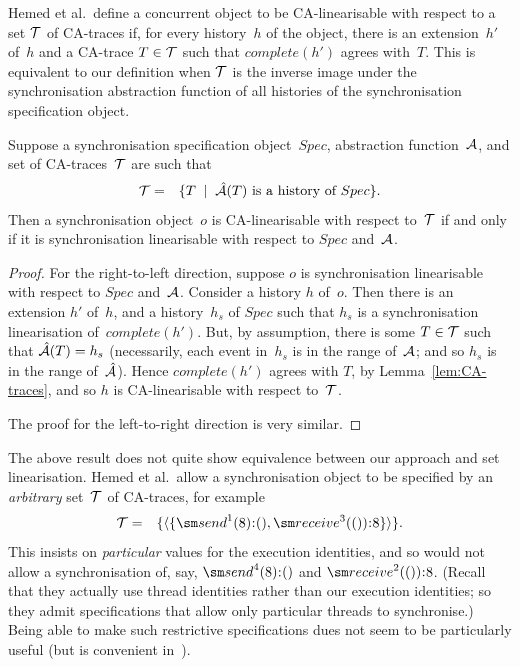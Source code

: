 Hemed et al.\ define a concurrent object to be CA-linearisable with respect to
a set $\mathcal{T}$ of CA-traces if, for every history~$h$ of the object, there is an
extension~$h'$ of~$h$ and a CA-trace $T \in \mathcal{T}$ such that $complete(h')$
agrees with~$T$.  This is equivalent to our definition when $\mathcal{T}$ is the
inverse image under the synchronisation abstraction function of all histories
of the synchronisation specification object.
%
\begin{prop}
\label{prop:set-lin}
Suppose a synchronisation specification object~$Spec$, abstraction
function~$\mathcal{A}$, and set of CA-traces~$\mathcal{T}$ are such that
\begin{eqnarray*}
\mathcal{T} & = & \{  T \;\mid\; \mbox{$\hat{\mathcal{A}}(T)$ is a history of~$Spec$} \}.
\end{eqnarray*}
Then a synchronisation object~$o$ is CA-linearisable with respect to~$\mathcal{T}$ if
and only if it is synchronisation linearisable with respect to $Spec$
and~$\mathcal{A}$.
\end{prop}
%
\begin{proof}
For the right-to-left direction, suppose $o$ is synchronisation linearisable
with respect to $Spec$ and~$\mathcal{A}$.  Consider a history $h$ of~$o$.  Then there
is an extension $h'$ of~$h$, and a history~$h_s$ of $Spec$ such that $h_s$ is
a synchronisation linearisation of~$complete(h')$.  But, by assumption, there
is some $T \in \mathcal{T}$ such that $\hat{\mathcal{A}}(T) = h_s$ (necessarily, each event
in~$h_s$ is in the range of~$\mathcal{A}$; and so $h_s$ is in the range of~$\hat{\mathcal{A}}$).
Hence $complete(h')$ agrees with $T$, by Lemma~\ref{lem:CA-traces}, and so $h$
is CA-linearisable with respect to~$\mathcal{T}$.

The proof for the left-to-right direction is very similar.
\end{proof}


The above result does not quite show equivalence between our approach and set
linearisation.  Hemed et al.\ allow a synchronisation object to be specified
by an \emph{arbitrary} set~$\mathcal{T}$ of CA-traces, for example
\begin{eqnarray*} 
\T & = & \set{ \seq{ \set{ \send^1(8)\::(), \receive^3(())\::8 } } }.
\end{eqnarray*}
This insists on \emph{particular} values for the execution identities, and so
would not allow a synchronisation of, say, $\send^4(8)\::()$ and
$\receive^2(())\::8$.  (Recall that they actually use thread identities rather
than our execution identities; so they admit specifications that allow only
particular threads to synchronise.)  Being able to make such restrictive
specifications dues not seem to be particularly useful (but is convenient
in~\cite{HRV-2015}).

